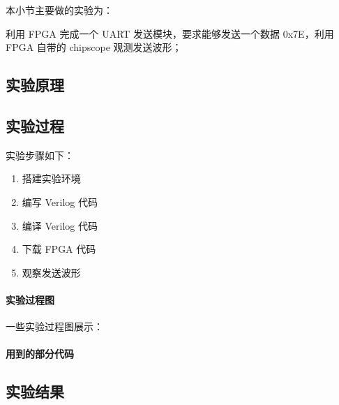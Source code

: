 

本小节主要做的实验为：

利用 FPGA 完成一个 UART 发送模块，要求能够发送一个数据 0x7E，利用 FPGA 自带的 chipscope
观测发送波形；

\subsection{实验原理}

\subsection{实验过程}
实验步骤如下：
\begin{enumerate}
    \item 搭建实验环境
    \item 编写 Verilog 代码
    \item 编译 Verilog 代码
    \item 下载 FPGA 代码
    \item 观察发送波形
\end{enumerate}


\paragraph{实验过程图}
一些实验过程图展示：




\paragraph{用到的部分代码}



\subsection{实验结果}
